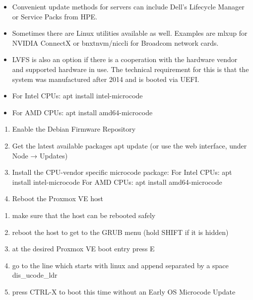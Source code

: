 \begin{itemize}[leftmargin=2cm]

	\item Convenient update methods for servers can include Dell’s Lifecycle Manager or Service Packs from HPE.

	\item Sometimes there are Linux utilities available as well. Examples are mlxup for NVIDIA ConnectX or bnxtnvm/niccli for Broadcom network cards.

	\item LVFS is also an option if there is a cooperation with the hardware vendor and supported hardware in use. The technical requirement for this is that the system was manufactured after 2014 and is booted via UEFI.

\end{itemize}

\begin{itemize}[leftmargin=2cm]

	\item For Intel CPUs: apt install intel-microcode

	\item For AMD CPUs: apt install amd64-microcode

\end{itemize}

\begin{enumerate}[leftmargin=2cm]

	\item Enable the Debian Firmware Repository

	\item Get the latest available packages apt update (or use the web interface, under Node → Updates)

	\item Install the CPU-vendor specific microcode package: For Intel CPUs: apt install intel-microcode For AMD CPUs: apt install amd64-microcode

	\item Reboot the Proxmox VE host

\end{enumerate}

\begin{enumerate}[leftmargin=2cm]

	\item make sure that the host can be rebooted safely

	\item reboot the host to get to the GRUB menu (hold SHIFT if it is hidden)

	\item at the desired Proxmox VE boot entry press E

	\item go to the line which starts with linux and append separated by a space dis_ucode_ldr

	\item press CTRL-X to boot this time without an Early OS Microcode Update

\end{enumerate}

